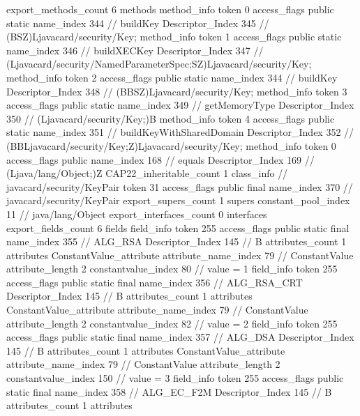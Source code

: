 {{{{{{{				}
				}
			}
			}
			export_methods_count	6
			methods {
				method_info {
					token	0
					access_flags	public static
					name_index	344		// buildKey
					Descriptor_Index	345		// (BSZ)Ljavacard/security/Key;
				}
				method_info {
					token	1
					access_flags	public static
					name_index	346		// buildXECKey
					Descriptor_Index	347		// (Ljavacard/security/NamedParameterSpec;SZ)Ljavacard/security/Key;
				}
				method_info {
					token	2
					access_flags	public static
					name_index	344		// buildKey
					Descriptor_Index	348		// (BBSZ)Ljavacard/security/Key;
				}
				method_info {
					token	3
					access_flags	public static
					name_index	349		// getMemoryType
					Descriptor_Index	350		// (Ljavacard/security/Key;)B
				}
				method_info {
					token	4
					access_flags	public static
					name_index	351		// buildKeyWithSharedDomain
					Descriptor_Index	352		// (BBLjavacard/security/Key;Z)Ljavacard/security/Key;
				}
				method_info {
					token	0
					access_flags	public
					name_index	168		// equals
					Descriptor_Index	169		// (Ljava/lang/Object;)Z
				}
			}
			CAP22_inheritable_count	1
		}
		class_info {		// javacard/security/KeyPair
			token	31
			access_flags	public final
			name_index	370		// javacard/security/KeyPair
			export_supers_count	1
			supers {
				constant_pool_index	11		// java/lang/Object
			}
			export_interfaces_count	0
			interfaces {
			}
			export_fields_count	6
			fields {
			field_info {
				token	255
				access_flags	public static final
				name_index	355		// ALG_RSA
				Descriptor_Index	145		// B
				attributes_count	1
				attributes {
				ConstantValue_attribute {
					attribute_name_index	79		// ConstantValue
					attribute_length	2
					constantvalue_index	80		// value = 1
				}
				}
			}
			field_info {
				token	255
				access_flags	public static final
				name_index	356		// ALG_RSA_CRT
				Descriptor_Index	145		// B
				attributes_count	1
				attributes {
				ConstantValue_attribute {
					attribute_name_index	79		// ConstantValue
					attribute_length	2
					constantvalue_index	82		// value = 2
				}
				}
			}
			field_info {
				token	255
				access_flags	public static final
				name_index	357		// ALG_DSA
				Descriptor_Index	145		// B
				attributes_count	1
				attributes {
				ConstantValue_attribute {
					attribute_name_index	79		// ConstantValue
					attribute_length	2
					constantvalue_index	150		// value = 3
				}
				}
			}
			field_info {
				token	255
				access_flags	public static final
				name_index	358		// ALG_EC_F2M
				Descriptor_Index	145		// B
				attributes_count	1
				attributes {
}}}}}}
